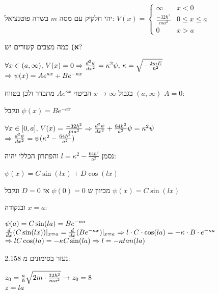 \documentclass[14pt]{extarticle}
\makeatletter
\newenvironment{lefteqs}{%
    \begin{english}%
    \begin{flushleft}%
    \renewcommand{\arraystretch}{1.3}%
    $\begin{array}{@{}l@{}}%
}{%
    \end{array}$%
    \end{flushleft}%
    \end{english}%
}
\makeatother
\begin{document}
יהי חלקיק עם מסה $m$ בשדה פוטנציאל: $V(x) = \begin{cases}
    \infty & x<0 \\
    \frac{-32\hbar^2}{ma^2} & 0 \leq x \leq a \\
    0 & x > a
\end{cases}$

\textbf{א)}
כמה מצבים קשורים יש?

\begin{lefteqs}
\forall x \in (a,\infty), \, V(x) = 0 \Rightarrow \frac{d^2 \psi}{dx^2} = \kappa^2 \psi, \, \kappa = \sqrt{-\frac{2mE}{\hbar^2}} \\
\Rightarrow \psi(x) = A e^{\kappa x} + B e^{-\kappa x} \\
\end{lefteqs}

בגבול $x \rightarrow \infty$ הביטוי $A e^{\kappa x}$ מתבדר ולכן בטווח $(a, \infty)$ $A=0$:

ונקבל $\psi(x) = B e^{-\kappa x}$

\begin{lefteqs}
    \forall x \in [0,a], \, V(x) = \frac{-32\hbar^2}{ma^2} \Rightarrow \frac{d^2 \psi}{dx^2} + \frac{64\hbar^2}{a^2}\psi = \kappa^2 \psi \\
    \Rightarrow \frac{d^2 \psi}{dx^2} = \psi (\kappa^2 - \frac{64\hbar^2}{a^2}) \\
\end{lefteqs}

נסמן $l=\kappa^2 - \frac{64\hbar^2}{a^2}$ והפתרון הכללי יהיה:

$\psi(x) = C\sin(lx) + D\cos(lx)$

מכיוון ש $\psi(0)=0$ אז $D=0$ ונקבל $\psi(x) = C\sin(lx)$

ובנקודה $x=a$:

\begin{lefteqs}
    \psi(a) = C\sin(la) = Be^{-\kappa a} \\
    \frac{d}{dx}(C\sin(lx))|_{x=a} = \frac{d}{dx}(Be^{-\kappa x})|_{x=a} \Rightarrow l\cdot C \cdot \cos(la) = -\kappa \cdot B \cdot e^{-\kappa a} \\
    \Rightarrow lC \cos(la) = -\kappa C \sin(la) \Rightarrow l=-\kappa tan(la) \\
\end{lefteqs}

נעזר בסימונים מ 2.158:

\begin{lefteqs}
    z_0 = \frac{a}{\hbar} \sqrt{2m \cdot \frac{32\hbar^2}{ma^2}} \rightarrow z_0 = 8 \\
    z=la \\
\end{lefteqs}
\end{document}
